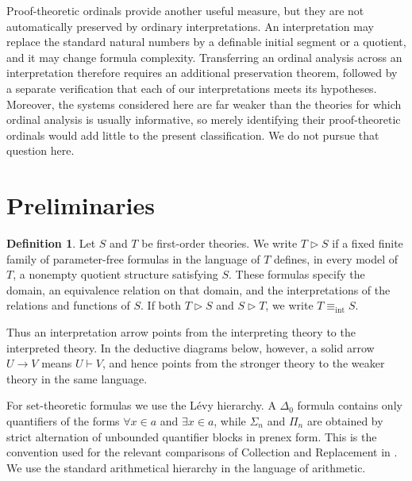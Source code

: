 \documentclass[11pt,a4paper]{article}
\newcommand{\Int}{\mathrel{\triangleright}}
\newcommand{\Mint}{\mathrel{\equiv_{\mathrm{int}}}}
\theoremstyle{plain}
\theoremstyle{definition}
\newtheorem{definition}[theorem]{Definition}
\theoremstyle{remark}
\begin{document}
Proof-theoretic ordinals provide another useful measure, but they are not automatically preserved by ordinary interpretations. An interpretation may replace the standard natural numbers by a definable initial segment or a quotient, and it may change formula complexity. Transferring an ordinal analysis across an interpretation therefore requires an additional preservation theorem, followed by a separate verification that each of our interpretations meets its hypotheses. Moreover, the systems considered here are far weaker than the theories for which ordinal analysis is usually informative, so merely identifying their proof-theoretic ordinals would add little to the present classification. We do not pursue that question here.

\section{Preliminaries}

\begin{definition}
Let \(S\) and \(T\) be first-order theories. We write \(T\Int S\) if a fixed finite family of parameter-free formulas in the language of \(T\) defines, in every model of \(T\), a nonempty quotient structure satisfying \(S\). These formulas specify the domain, an equivalence relation on that domain, and the interpretations of the relations and functions of \(S\). If both \(T\Int S\) and \(S\Int T\), we write \(T\Mint S\).
\end{definition}

Thus an interpretation arrow points from the interpreting theory to the interpreted theory. In the deductive diagrams below, however, a solid arrow \(U\longrightarrow V\) means \(U\vdash V\), and hence points from the stronger theory to the weaker theory in the same language.

For set-theoretic formulas we use the L\'evy hierarchy. A \(\Delta_0\) formula contains only quantifiers of the forms \(\forall x\in a\) and \(\exists x\in a\), while \(\Sigma_n\) and \(\Pi_n\) are obtained by strict alternation of unbounded quantifier blocks in prenex form. This is the convention used for the relevant comparisons of Collection and Replacement in \citep{Mathias2007}. We use the standard arithmetical hierarchy in the language of arithmetic.
\end{document}
